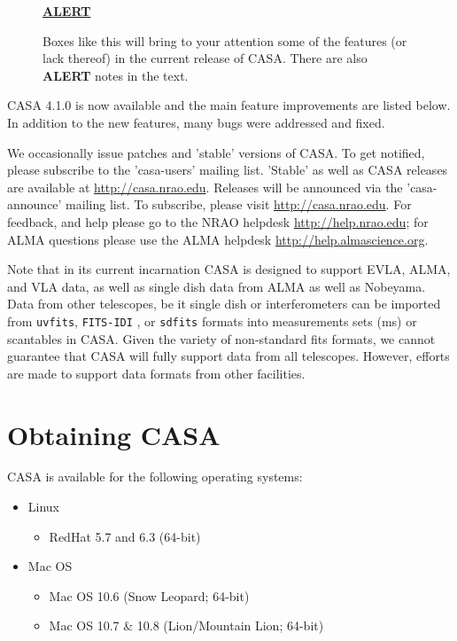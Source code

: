 \begin{wrapfigure}{r}{2.5in}
  \begin{boxedminipage}{2.5in}
     \centerline{\underline{\bf ALERT}}
     Boxes like this will bring to your attention some of the
     features (or lack thereof) in the current release
     of CASA.  There are also {\bf ALERT} notes in the text.
  \end{boxedminipage}
\end{wrapfigure}

CASA 4.1.0 is now available and the main feature improvements are
listed below. In addition to the new features, many bugs were
addressed and fixed.

We occasionally issue patches and 'stable' versions of CASA. To get
notified, please subscribe to the 'casa-users' mailing list. 'Stable'
as well as CASA releases are available at
\url{http://casa.nrao.edu}. Releases will be announced via the
'casa-announce' mailing list. To subscribe, please visit
\url{http://casa.nrao.edu}. For feedback, and help please go to the
NRAO helpdesk \url{http://help.nrao.edu}; for ALMA questions please
use the ALMA helpdesk \url{http://help.almascience.org}.

Note that in its current incarnation CASA is designed to support EVLA,
ALMA, and VLA data, as well as single dish data from ALMA as well as
Nobeyama. Data from other telescopes, be it single dish or
interferometers can be imported from {\tt uvfits}, {\tt FITS-IDI} , or
{\tt sdfits} formats into measurements sets (ms) or scantables in
CASA. Given the variety of non-standard fits formats, we cannot
guarantee that CASA will fully support data from all
telescopes. However, efforts are made to support data formats from
other facilities.




\section{Obtaining CASA}
\label{section:intro.obtaining}


CASA is available for the following operating systems:

\begin{itemize}
    \item Linux
      \begin{itemize}
          \item RedHat 5.7 and 6.3 (64-bit)
      \end{itemize}
      

    \item Mac OS
         \begin{itemize}
          \item Mac OS 10.6 (Snow Leopard; 64-bit) 
          \item Mac OS 10.7 \& 10.8 (Lion/Mountain Lion; 64-bit)
\end{itemize}
\end{itemize}


